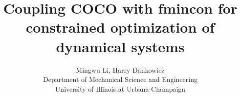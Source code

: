 \documentclass[final,12pt]{article}
\begin{document}
\lstset{language=coco}

\title{Coupling COCO with fmincon for constrained optimization of dynamical systems}

\author{Mingwu Li, Harry Dankowicz\\ Department of Mechanical Science and Engineering\\ University of Illinois at Urbana-Champaign}

\maketitle

\tableofcontents
\newpage

\end{document}
